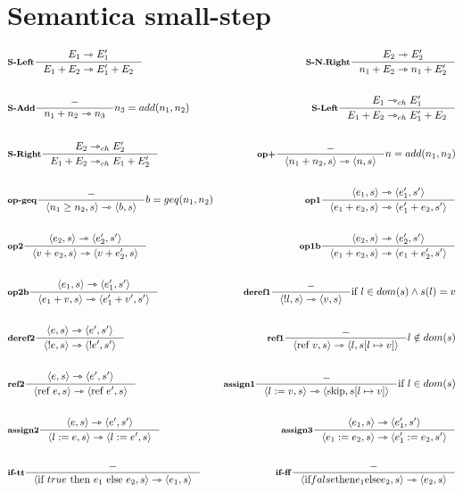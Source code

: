 \documentclass[a4paper, 10pt]{article}
\newcommand{\infer}[4]{\inference[\textbf{#1}]{#2}{#3}#4 }
\newcommand{\srule}[2]{\langle #1 \rangle \rightarrowtriangle \langle #2 \rangle}
\newcommand{\memrep}[3]{#1 \lbrack #2 \mapsto #3 \rbrack}
\newcommand{\goesto}{\rightarrowtriangle}
\begin{document}
\section*{Semantica small-step}
	\begin{align*}
		&\infer{S-Left}{E_1 \goesto E_1' }{E_1 + E_2 \goesto E_1' + E_2}{} 
		&\infer{S-N.Right}{E_2 \goesto E_2'}{n_1 + E_2 \goesto n_1 + E_2'}{} \\ \\
		&\infer{S-Add}{-}{n_1+n_2 \goesto n_3}{n_3 = add(n_1, n_2)} 
		&\infer{S-Left}{E_1 \goesto_{ch} E_1'}{E_1 + E_2 \goesto_{ch} E_1' + E_2}{}\\ \\
		&\infer{S-Right}{E_2 \goesto_{ch} E_2'}{E_1 + E_2 \goesto_{ch} E_1 + E_2'}{}
		&\infer{op+}{-}{\srule{n_1 + n_2,s}{n,s}}{n=add(n_1,n_2)}\\ \\
		&\infer{op-geq}{-}{\srule{n_1 \geq n_2,s}{b,s}}{b=geq(n_1, n_2)} 
		&\infer{op1}{\srule{e_1,s}{e_1', s'}}{\srule{e_1 + e_2,s}{e_1' + e_2,s'}}{} \\ \\
		&\infer{op2}{\srule{e_2,s}{e_2', s'}}{\srule{v + e_2,s}{v + e_2',s}}{} 
		&\infer{op1b}{\srule{e_2,s}{e_2', s'}}{\srule{e_1 + e_2,s}{e_1 + e_2',s'}}{} \\ \\
		&\infer{op2b}{\srule{e_1,s}{e_1', s'}}{\srule{e_1 + v,s}{e_1' + v',s'}}{} 
		&\infer{deref1}{-}{\srule{!l,s}{v,s}}{\text{if } l \in dom(s) \wedge s(l)=v} \\ \\
		&\infer{deref2}{\srule{e,s}{e',s'}}{\srule{!e,s}{!e',s'}}{} 
		&\infer{ref1}{-}{\srule{\text{ref }v, s}{l, \memrep{s}{l}{v}}}{l \notin dom(s)} \\ \\
		&\infer{ref2}{\srule{e,s}{e',s'}}{\srule{\text{ref }e,s}{\text{ref } e',s}}{} 
		&\infer{assign1}{-}{\srule{l:=v,s}{\text{skip}, \memrep{s}{l}{v}}}{\text{if } l \in dom(s)}	 \\ \\
		&\infer{assign2}{\srule{e,s}{e',s'}}{\srule{l:=e,s}{l:=e',s}}{} 
		&\infer{assign3}{\srule{e_1,s}{e_1',s'}}{\srule{e_1:=e_2,s}{e_1':=e_2,s'}}{}\\ \\
		&\infer{if-tt}{-}{\srule{\text{if } true \text{ then } e_1 \text{ else } e_2,s}{e_1,s}}{}
		&\infer{if-ff}{-}{\srule{\text{if} false \text{then} e_1 \text{else} e_2,s}{e_2,s}}{} \\ \\

\end{align*}
\end{document}
